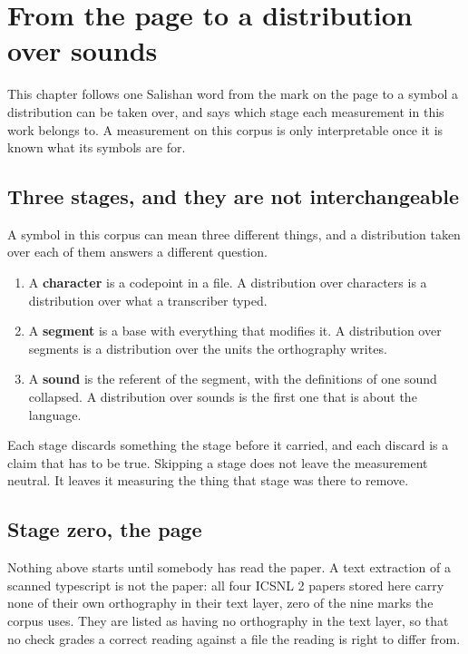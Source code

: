 \chapter{From the page to a distribution over sounds}

This chapter follows one Salishan word from the mark on the page to a symbol a distribution can be
taken over, and says which stage each measurement in this work belongs to. A measurement on this
corpus is only interpretable once it is known what its symbols are for.

\section{Three stages, and they are not interchangeable}

A symbol in this corpus can mean three different things, and a distribution taken over each of them
answers a different question.

\begin{enumerate}
  \item A \textbf{character} is a codepoint in a file. A distribution over characters is a
        distribution over what a transcriber typed.
  \item A \textbf{segment} is a base with everything that modifies it. A distribution over segments
        is a distribution over the units the orthography writes.
  \item A \textbf{sound} is the referent of the segment, with the definitions of one sound collapsed.
        A distribution over sounds is the first one that is about the language.
\end{enumerate}

Each stage discards something the stage before it carried, and each discard is a claim that has to
be true. Skipping a stage does not leave the measurement neutral. It leaves it measuring the thing
that stage was there to remove.

\section{Stage zero, the page}

Nothing above starts until somebody has read the paper. A text extraction of a scanned typescript is
not the paper: all four ICSNL 2 papers stored here \cite{src:Elmendorf-1967, src:Hamp-1967,
src:Hess-1967, src:Kinkade-1967} carry none of their own orthography in their text layer, zero of
the nine marks the corpus uses. They are listed as having no orthography in the text layer, so that
no check grades a correct reading against a file the reading is right to differ from.

